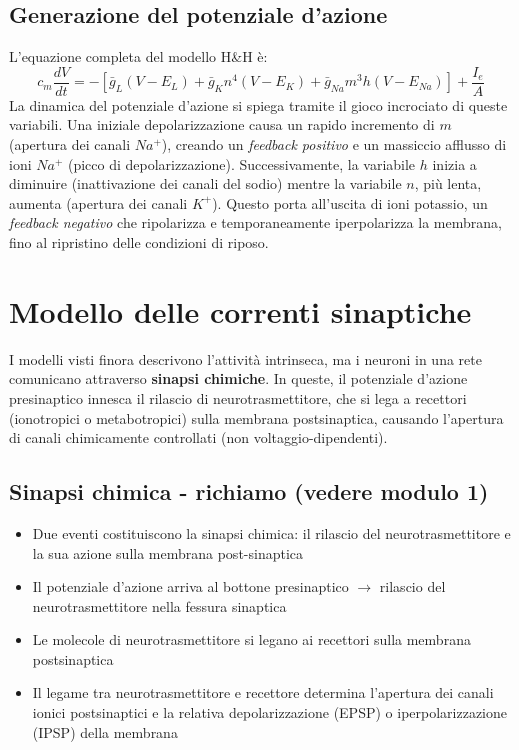\subsection{Generazione del potenziale d'azione}
L'equazione completa del modello H\&H è:
\begin{equation}
c_m \frac{dV}{dt} = -\left[ \bar{g}_L(V-E_L) + \bar{g}_K n^4(V-E_K) + \bar{g}_{Na} m^3 h(V-E_{Na}) \right] + \frac{I_e}{A}
\end{equation}
La dinamica del potenziale d'azione si spiega tramite il gioco incrociato di queste variabili. Una iniziale depolarizzazione causa un rapido incremento di $m$ (apertura dei canali $Na^+$), creando un \emph{feedback positivo} e un massiccio afflusso di ioni $Na^+$ (picco di depolarizzazione). Successivamente, la variabile $h$ inizia a diminuire (inattivazione dei canali del sodio) mentre la variabile $n$, più lenta, aumenta (apertura dei canali $K^+$). Questo porta all'uscita di ioni potassio, un \emph{feedback negativo} che ripolarizza e temporaneamente iperpolarizza la membrana, fino al ripristino delle condizioni di riposo.

\section{Modello delle correnti sinaptiche}

I modelli visti finora descrivono l'attività intrinseca, ma i neuroni in una rete comunicano attraverso \textbf{sinapsi chimiche}. In queste, il potenziale d'azione presinaptico innesca il rilascio di neurotrasmettitore, che si lega a recettori (ionotropici o metabotropici) sulla membrana postsinaptica, causando l'apertura di canali chimicamente controllati (non voltaggio-dipendenti).

\subsection*{Sinapsi chimica - richiamo (vedere modulo 1)}

\begin{itemize}
    \item Due eventi costituiscono la sinapsi chimica: il rilascio del neurotrasmettitore e la sua azione sulla membrana post-sinaptica
    \item Il potenziale d'azione arriva al bottone presinaptico $\rightarrow$ rilascio del neurotrasmettitore nella fessura sinaptica
    \item Le molecole di neurotrasmettitore si legano ai recettori sulla membrana postsinaptica
    \item Il legame tra neurotrasmettitore e recettore determina l'apertura dei canali ionici postsinaptici e la relativa depolarizzazione (EPSP) o iperpolarizzazione (IPSP) della membrana
\end{itemize}

